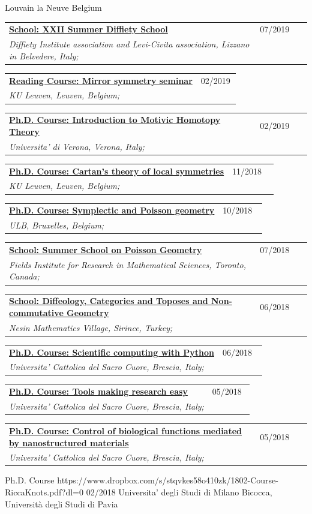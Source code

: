 \documentclass[a4paper]{article}
\newcommand{\longvoice}[8]{
	\begin{tabular}{p{0.83\linewidth} p{0.17\linewidth} }
		\textbf{\href{#3}{#2: #1}} & #4 
		\\ 
		\textit{#5, #6, #7;} & {\small\emph{#8}}
	\end{tabular}
	\vspace{.5em}
}
\begin{document}
		{Louvain la Neuve}
		{Belgium}
		{}
	\longvoice{XXII Summer Diffiety School}
		{School}
		{https://sites.google.com/site/levicivitainstitute/Activities/DiffietySchools/xxii-summer-diffiety-school}
		{07/2019}
		{Diffiety Institute association and Levi-Civita association}
		{Lizzano in Belvedere}
		{Italy}
		{}
	\longvoice{Mirror symmetry seminar}
		{Reading Course}
		{https://wis.kuleuven.be/algebra/mirror-symmetry-seminar}
		{02/2019}
		{KU Leuven}
		{Leuven}
		{Belgium}
		{}
	\longvoice{Introduction to Motivic Homotopy Theory}
		{Ph.D. Course}
		{https://www.dropbox.com/s/fpqd1xsz4g8ecu4/1902-Verona-MotivicHomotopy.pdf?dl=0}
		{02/2019}
		{Universita' di Verona}
		{Verona}
		{Italy}
		{}
	\longvoice{Cartan's theory of local symmetries}
		{Ph.D. Course}
		{https://wis.kuleuven.be/methusalem-pure-math/methusalem-lecture-series/methusalem-lecture-series}
		{11/2018}
		{KU Leuven}
		{Leuven}
		{Belgium}
		{}
	\longvoice{Symplectic and Poisson geometry}
		{Ph.D. Course}
		{https://web.archive.org/web/20190831102514/http://homepages.ulb.ac.be/~rklaasse/symplecticpoissongeometry.html}
		{10/2018}
		{ULB}
		{Bruxelles}
		{Belgium}
		{}
	\longvoice{Summer School on Poisson Geometry}
		{School}
		{https://web.archive.org/web/20190831105310/http://www.fields.utoronto.ca/activities/18-19/poisson-summer-school}
		{07/2018}
		{Fields Institute for Research in Mathematical Sciences}
		{Toronto}
		{Canada}
		{}
	\longvoice{Diffeology, Categories and Toposes and Non-commutative Geometry}
		{School}
		{https://web.archive.org/web/20171123204026/http://www.nesinkoyleri.org/eng/events-detail.php?egitimkod=203\#icerikler}
		{06/2018}
		{Nesin Mathematics Village}
		{Sirince}
		{Turkey}
		{}
	\longvoice{Scientific computing with Python}
		{Ph.D. Course}
		{https://web.archive.org/web/20180604081514/http://dmf.unicatt.it/~della/pythoncourse18/}
		{06/2018}
		{Universita' Cattolica del Sacro Cuore}
		{Brescia}
		{Italy}
		{}
	\longvoice{Tools making research easy}
		{Ph.D. Course}
		{https://web.archive.org/web/20180604080852/http://www.dmf.unicatt.it/kropf/scientifictools18.html}
		{05/2018}
		{Universita' Cattolica del Sacro Cuore}
		{Brescia}
		{Italy}
		{}
	\longvoice{Control of biological functions mediated by nanostructured materials}
		{Ph.D. Course}
		{https://www.dropbox.com/s/8udz4zmfaxr9xb8/1805-Course-Ciofani.pdf?dl=0}
		{05/2018}
		{Universita' Cattolica del Sacro Cuore}
		{Brescia}
		{Italy}
		{}
		{Ph.D. Course}
		{https://www.dropbox.com/s/stqvkes58o410zk/1802-Course-RiccaKnots.pdf?dl=0}
		{02/2018}
		{Universita' degli Studi di Milano Bicocca, Università degli Studi di Pavia}
\end{document}

